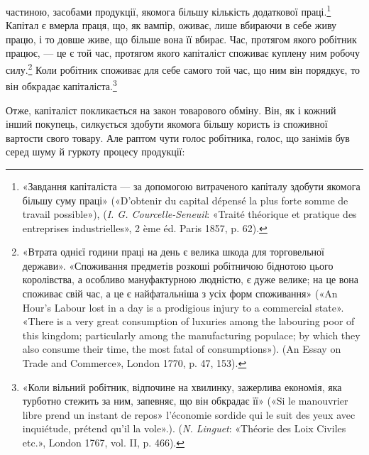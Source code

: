 \parcont{}  %
частиною, засобами продукції, якомога більшу кількість додаткової
праці.\footnote{
«Завдання капіталіста — за допомогою витраченого капіталу здобути
якомога більшу суму праці» («D’obtenir du capital dépensé la
plus forte somme de travail possible»), (\emph{I. G. Courcelle-Seneuil}: «Traité
théorique et pratique des entreprises industrielles», 2 ème éd. Paris 1857,
p. 62).
} Капітал є вмерла праця, що, як вампір, оживає,
лише вбираючи в себе живу працю, і то довше живе, що більше
вона її вбирає. Час, протягом якого робітник працює, — це є
той час, протягом якого капіталіст споживає куплену ним робочу
силу.\footnote{
«Втрата однієї години праці на день є велика шкода для торговельної
держави». «Споживання предметів розкоші робітничою біднотою цього
королівства, а особливо мануфактурною людністю, є дуже велике; на це
вона споживає свій час, а це є найфатальніша з усіх форм споживання»
(«An Hour’s Labour lost in a day is a prodigious injury to a commercial
state». «There is a very great consumption of luxuries among the labouring
poor of this kingdom; particularly among the manufacturing populace; by
which they also consume their time, the most fatal of consumptions»). (An
Essay on Trade and Commerce», London 1770, p. 47, 153).
} Коли робітник споживає для себе самого той час, що ним
він порядкує, то він обкрадає капіталіста.\footnote{
«Коли вільний робітник, відпочине на хвилинку, зажерлива економія,
яка турботно стежить за ним, запевняє, що він обкрадає її» («Si le
manouvrier libre prend un instant de repos» l’économie sordide qui le suit
des yeux avec inquiétude, prétend qu’il la vole».). (\emph{N. Linguet}: «Théorie
des Loix Civiles etc.», London 1767, vol. II, p. 466).
}

Отже, капіталіст покликається на закон товарового обміну.
Він, як і кожний інший покупець, силкується здобути якомога
більшу користь із споживної вартости свого товару. Але раптом
чути голос робітника, голос, що занімів був серед шуму й гуркоту
процесу продукції:


